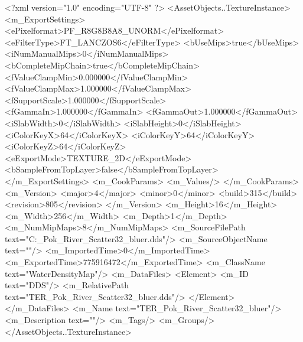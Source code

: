 <?xml version="1.0" encoding="UTF-8" ?>
<AssetObjects..TextureInstance>
	<m_ExportSettings>
		<ePixelformat>PF_R8G8B8A8_UNORM</ePixelformat>
		<eFilterType>FT_LANCZOS6</eFilterType>
		<bUseMips>true</bUseMips>
		<iNumManualMips>0</iNumManualMips>
		<bCompleteMipChain>true</bCompleteMipChain>
		<fValueClampMin>0.000000</fValueClampMin>
		<fValueClampMax>1.000000</fValueClampMax>
		<fSupportScale>1.000000</fSupportScale>
		<fGammaIn>1.000000</fGammaIn>
		<fGammaOut>1.000000</fGammaOut>
		<iSlabWidth>0</iSlabWidth>
		<iSlabHeight>0</iSlabHeight>
		<iColorKeyX>64</iColorKeyX>
		<iColorKeyY>64</iColorKeyY>
		<iColorKeyZ>64</iColorKeyZ>
		<eExportMode>TEXTURE_2D</eExportMode>
		<bSampleFromTopLayer>false</bSampleFromTopLayer>
	</m_ExportSettings>
	<m_CookParams>
		<m_Values/>
	</m_CookParams>
	<m_Version>
		<major>4</major>
		<minor>0</minor>
		<build>315</build>
		<revision>805</revision>
	</m_Version>
	<m_Height>16</m_Height>
	<m_Width>256</m_Width>
	<m_Depth>1</m_Depth>
	<m_NumMipMaps>8</m_NumMipMaps>
	<m_SourceFilePath text="C:\Users\ilovewubbabzy\Desktop\TER_Pok_River_Scatter32_bluer.dds"/>
	<m_SourceObjectName text=""/>
	<m_ImportedTime>0</m_ImportedTime>
	<m_ExportedTime>775916472</m_ExportedTime>
	<m_ClassName text="WaterDensityMap"/>
	<m_DataFiles>
		<Element>
			<m_ID text="DDS"/>
			<m_RelativePath text="TER_Pok_River_Scatter32_bluer.dds"/>
		</Element>
	</m_DataFiles>
	<m_Name text="TER_Pok_River_Scatter32_bluer"/>
	<m_Description text=""/>
	<m_Tags/>
	<m_Groups/>
</AssetObjects..TextureInstance>

